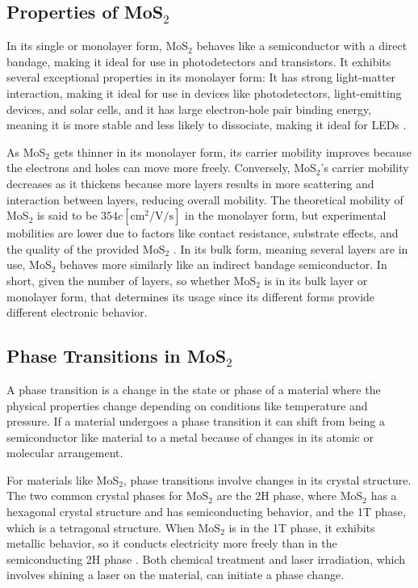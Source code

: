 \documentclass[conference]{IEEEtran}
\begin{document}
\subsection{Properties of MoS$_2$}

In its single or monolayer form, MoS$_2$ behaves like a semiconductor with a direct bandage, making it ideal for use in photodetectors and transistors. It exhibits several exceptional properties in its monolayer form: It has strong light-matter interaction, making it ideal for use in devices like photodetectors, light-emitting devices, and solar cells, and it has large electron-hole pair binding energy, meaning it is more stable and less likely to dissociate, making it ideal for LEDs \cite{oa2}.

As MoS$_2$ gets thinner in its monolayer form, its carrier mobility improves because the electrons and holes can move more freely. Conversely, MoS$_2$'s carrier mobility decreases as it thickens because more layers results in more scattering and interaction between layers, reducing overall mobility. The theoretical mobility of MoS$_2$ is said to be $354c[\si{\centi\meter\squared\per\volt\per\second}]$ in the monolayer form, but experimental mobilities are lower due to factors like contact resistance, substrate effects, and the quality of the provided MoS$_2$ \cite{oa3}. In its bulk form, meaning several layers are in use, MoS$_2$ behaves more similarly like an indirect bandage semiconductor. In short, given the number of layers, so whether MoS$_2$ is in its bulk layer or monolayer form, that determines its usage since its different forms provide different electronic behavior. 

\subsection{Phase Transitions in MoS$_2$}

A phase transition is a change in the state or phase of a material where the physical properties change depending on conditions like temperature and pressure. If a material undergoes a phase transition it can shift from being a semiconductor like material to a metal because of changes in its atomic or molecular arrangement. 

For materials like MoS$_2$, phase transitions involve changes in its crystal structure. The two common crystal phases for MoS$_2$ are the 2H phase, where MoS$_2$ has a hexagonal crystal structure and has semiconducting behavior, and the 1T phase, which is a tetragonal structure. When MoS$_2$ is in the 1T phase, it exhibits metallic behavior, so it conducts electricity more freely than in the semiconducting 2H phase \cite{oa4}. Both chemical treatment and laser irradiation, which involves shining a laser on the material, can initiate a phase change. 
\end{document}
